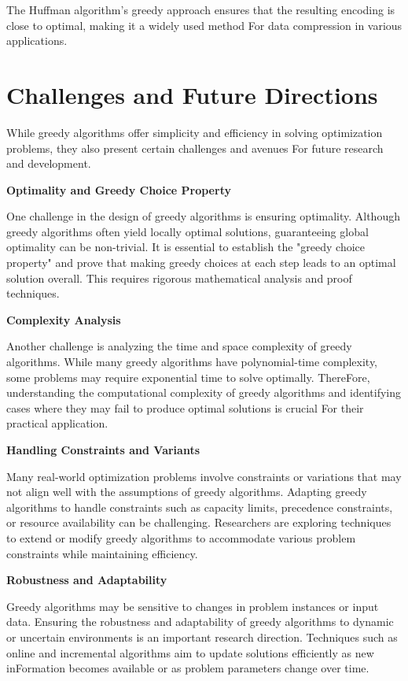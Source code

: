 \documentclass[12pt]{book} %
\begin{document}
The Huffman algorithm's greedy approach ensures that the resulting encoding is close to optimal, making it a widely used method For data compression in various applications.

\section{Challenges and Future Directions}

While greedy algorithms offer simplicity and efficiency in solving optimization problems, they also present certain challenges and avenues For future research and development.

\textbf{Optimality and Greedy Choice Property}

One challenge in the design of greedy algorithms is ensuring optimality. Although greedy algorithms often yield locally optimal solutions, guaranteeing global optimality can be non-trivial. It is essential to establish the "greedy choice property" and prove that making greedy choices at each step leads to an optimal solution overall. This requires rigorous mathematical analysis and proof techniques.

\textbf{Complexity Analysis}

Another challenge is analyzing the time and space complexity of greedy algorithms. While many greedy algorithms have polynomial-time complexity, some problems may require exponential time to solve optimally. ThereFore, understanding the computational complexity of greedy algorithms and identifying cases where they may fail to produce optimal solutions is crucial For their practical application.

\textbf{Handling Constraints and Variants}

Many real-world optimization problems involve constraints or variations that may not align well with the assumptions of greedy algorithms. Adapting greedy algorithms to handle constraints such as capacity limits, precedence constraints, or resource availability can be challenging. Researchers are exploring techniques to extend or modify greedy algorithms to accommodate various problem constraints while maintaining efficiency.

\textbf{Robustness and Adaptability}

Greedy algorithms may be sensitive to changes in problem instances or input data. Ensuring the robustness and adaptability of greedy algorithms to dynamic or uncertain environments is an important research direction. Techniques such as online and incremental algorithms aim to update solutions efficiently as new inFormation becomes available or as problem parameters change over time.
\end{document}
